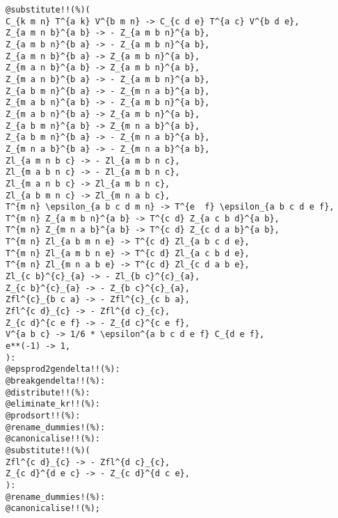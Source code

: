 \documentclass[11pt]{article}
\begin{document}
{\color[named]{Blue}\begin{verbatim}
@substitute!!(%)(
C_{k m n} T^{a k} V^{b m n} -> C_{c d e} T^{a c} V^{b d e},
Z_{a m n b}^{a b} -> - Z_{a m b n}^{a b},
Z_{a m b n}^{b a} -> - Z_{a m b n}^{a b},
Z_{a m n b}^{b a} -> Z_{a m b n}^{a b},
Z_{m a n b}^{a b} -> Z_{a m b n}^{a b},
Z_{m a n b}^{b a} -> - Z_{a m b n}^{a b},
Z_{a b m n}^{b a} -> - Z_{m n a b}^{a b},
Z_{m a b n}^{a b} -> - Z_{a m b n}^{a b},
Z_{m a b n}^{b a} -> Z_{a m b n}^{a b},
Z_{a b m n}^{a b} -> Z_{m n a b}^{a b},
Z_{a b m n}^{b a} -> - Z_{m n a b}^{a b},
Z_{m n a b}^{b a} -> - Z_{m n a b}^{a b},
Zl_{a m n b c} -> - Zl_{a m b n c},
Zl_{m a b n c} -> - Zl_{a m b n c},
Zl_{m a n b c} -> Zl_{a m b n c},
Zl_{a b m n c} -> Zl_{m n a b c},
T^{m n} \epsilon_{a b c d m n} -> T^{e  f} \epsilon_{a b c d e f},
T^{m n} Z_{a m b n}^{a b} -> T^{c d} Z_{a c b d}^{a b},
T^{m n} Z_{m n a b}^{a b} -> T^{c d} Z_{c d a b}^{a b},
T^{m n} Zl_{a b m n e} -> T^{c d} Zl_{a b c d e},
T^{m n} Zl_{a m b n e} -> T^{c d} Zl_{a c b d e},
T^{m n} Zl_{m n a b e} -> T^{c d} Zl_{c d a b e},
Zl_{c b}^{c}_{a} -> - Zl_{b c}^{c}_{a},
Z_{c b}^{c}_{a} -> - Z_{b c}^{c}_{a},
Zfl^{c}_{b c a} -> - Zfl^{c}_{c b a},
Zfl^{c d}_{c} -> - Zfl^{d c}_{c},
Z_{c d}^{c e f} -> - Z_{d c}^{c e f},
V^{a b c} -> 1/6 * \epsilon^{a b c d e f} C_{d e f},
e**(-1) -> 1,
):
@epsprod2gendelta!!(%):
@breakgendelta!!(%):
@distribute!!(%):
@eliminate_kr!!(%):
@prodsort!!(%):
@rename_dummies!(%):
@canonicalise!!(%):
@substitute!!(%)(
Zfl^{c d}_{c} -> - Zfl^{d c}_{c},
Z_{c d}^{d e c} -> - Z_{c d}^{d c e},
):
@rename_dummies!(%):
@canonicalise!!(%);
\end{verbatim}}
\end{document}
